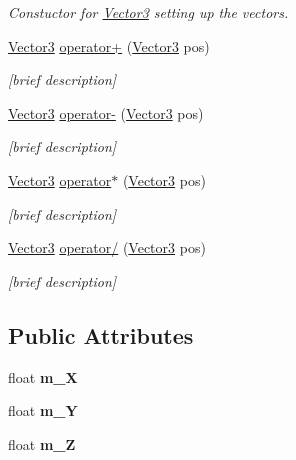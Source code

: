 \begin{DoxyCompactItemize}
\begin{DoxyCompactList}\small\item\em Constuctor for \hyperlink{struct_vector3}{Vector3} setting up the vectors. \end{DoxyCompactList}\item 
\hyperlink{struct_vector3}{Vector3} \hyperlink{struct_vector3_a15fe643f1a60db32bc90fada912d5886}{operator+} (\hyperlink{struct_vector3}{Vector3} pos)
\begin{DoxyCompactList}\small\item\em \mbox{[}brief description\mbox{]} \end{DoxyCompactList}\item 
\hyperlink{struct_vector3}{Vector3} \hyperlink{struct_vector3_a5652cc75947bccd44a04a353226f3943}{operator-\/} (\hyperlink{struct_vector3}{Vector3} pos)
\begin{DoxyCompactList}\small\item\em \mbox{[}brief description\mbox{]} \end{DoxyCompactList}\item 
\hyperlink{struct_vector3}{Vector3} \hyperlink{struct_vector3_aabd796697d63625e0a6723e0d88f8da7}{operator$\ast$} (\hyperlink{struct_vector3}{Vector3} pos)
\begin{DoxyCompactList}\small\item\em \mbox{[}brief description\mbox{]} \end{DoxyCompactList}\item 
\hyperlink{struct_vector3}{Vector3} \hyperlink{struct_vector3_af9c4cf04f1023d5933416d6c931a54cc}{operator/} (\hyperlink{struct_vector3}{Vector3} pos)
\begin{DoxyCompactList}\small\item\em \mbox{[}brief description\mbox{]} \end{DoxyCompactList}\end{DoxyCompactItemize}
\subsection*{Public Attributes}
\begin{DoxyCompactItemize}
\item 
\hypertarget{struct_vector3_ae3c898eb50be07d39f16964b0328f395}{float {\bfseries m\-\_\-\-X}}\label{struct_vector3_ae3c898eb50be07d39f16964b0328f395}

\item 
\hypertarget{struct_vector3_ac36308f26ba3de04273290a8d430bd3a}{float {\bfseries m\-\_\-\-Y}}\label{struct_vector3_ac36308f26ba3de04273290a8d430bd3a}

\item 
\hypertarget{struct_vector3_aed5814ac3580ece53e3da338346a14ff}{float {\bfseries m\-\_\-\-Z}}\label{struct_vector3_aed5814ac3580ece53e3da338346a14ff}

\end{DoxyCompactItemize}



